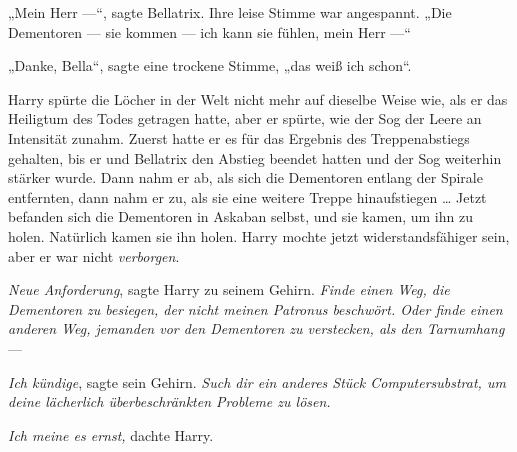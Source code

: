 „Mein Herr —“, sagte Bellatrix. Ihre leise Stimme war angespannt.
„Die Dementoren — sie kommen — ich kann sie fühlen, mein Herr —“

„Danke, Bella“, sagte eine trockene Stimme, „das weiß ich schon“.

Harry spürte die Löcher in der Welt nicht mehr auf dieselbe Weise wie, als er das Heiligtum des Todes getragen hatte, aber er spürte, wie der Sog der Leere an Intensität zunahm. Zuerst hatte er es für das Ergebnis des Treppenabstiegs gehalten, bis er und Bellatrix den Abstieg beendet hatten und der Sog weiterhin stärker wurde. Dann nahm er ab, als sich die Dementoren entlang der Spirale entfernten, dann nahm er zu, als sie eine weitere Treppe hinaufstiegen … Jetzt befanden sich die Dementoren in Askaban selbst, und sie kamen, um ihn zu holen. Natürlich kamen sie ihn holen. Harry mochte jetzt widerstandsfähiger sein, aber er war nicht \emph{verborgen}.

\emph{Neue Anforderung}, sagte Harry zu seinem Gehirn. \emph{Finde einen Weg, die Dementoren zu besiegen, der nicht meinen Patronus beschwört. Oder finde einen anderen Weg, jemanden vor den Dementoren zu verstecken, als den Tarnumhang} —

\emph{Ich kündige}, sagte sein Gehirn. \emph{Such dir ein anderes Stück Computersubstrat, um deine lächerlich überbeschränkten Probleme zu lösen.}

\emph{Ich meine es ernst,} dachte Harry.

